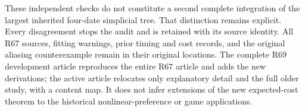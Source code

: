 These independent checks do not constitute a second complete integration of the largest inherited four-date simplicial tree. That distinction remains explicit. Every disagreement stops the audit and is retained with its source identity. All R67 sources, fitting warnings, prior timing and cost records, and the original aliasing counterexample remain in their original locations. The complete R69 development article reproduces the entire R67 article and adds the new derivations; the active article relocates only explanatory detail and the full older study, with a content map. It does not infer extensions of the new expected-cost theorem to the historical nonlinear-preference or game applications.
